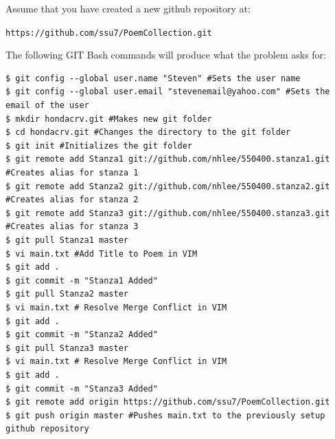 \documentclass[12pt]{article}
\begin{document}
\noindent Assume that you have created a new github repository at: 
\begin{center} 
\texttt{https://github.com/ssu7/PoemCollection.git}
\end{center} 
\newline The following GIT Bash commands will produce what the problem asks for:
\begin{lstlisting}
$ git config --global user.name "Steven" #Sets the user name
$ git config --global user.email "stevenemail@yahoo.com" #Sets the email of the user
$ mkdir hondacrv.git #Makes new git folder
$ cd hondacrv.git #Changes the directory to the git folder
$ git init #Initializes the git folder
$ git remote add Stanza1 git://github.com/nhlee/550400.stanza1.git #Creates alias for stanza 1
$ git remote add Stanza2 git://github.com/nhlee/550400.stanza2.git #Creates alias for stanza 2
$ git remote add Stanza3 git://github.com/nhlee/550400.stanza3.git #Creates alias for stanza 3
$ git pull Stanza1 master
$ vi main.txt #Add Title to Poem in VIM
$ git add .
$ git commit -m "Stanza1 Added"
$ git pull Stanza2 master
$ vi main.txt # Resolve Merge Conflict in VIM
$ git add .
$ git commit -m "Stanza2 Added"
$ git pull Stanza3 master
$ vi main.txt # Resolve Merge Conflict in VIM
$ git add .
$ git commit -m "Stanza3 Added"
$ git remote add origin https://github.com/ssu7/PoemCollection.git
$ git push origin master #Pushes main.txt to the previously setup github repository
\end{lstlisting}


\end{document}
